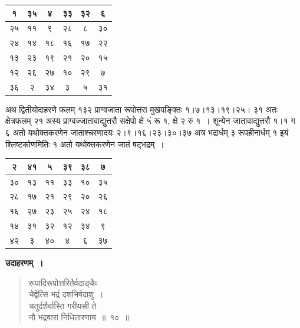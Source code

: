 \documentclass[11pt, openany]{book}
\begin{document}
\begin{table}[h]
	\centering
	\setlength{\extrarowheight}{2pt} \setlength{\tabcolsep}{2pt}
	\begin{tabular}{|c|c|c|c|c|c|}
		\hline
		१& ३५ & ४ & ३३ & ३२ & ६\\
		\hline
		२५ & ११ & ९ & २८ & ८ & ३० \\
		\hline
		२४ & १४ & १८ & १६ & १७ & २२\\
		\hline
		१३ & २३ & १९ & २१ & २० & १५\\
		\hline
		१२ & २६ & २७ & १० & २९ & ७ \\
		\hline
		३६ & २ & ३४ & ३ & ५ & ३१\\
		\hline
	\end{tabular}\qquad
\end{table}

अथ द्वितीयोदाहरणे फलम् १३२ प्राग्वजाता रूपोत्तरा मुखपङ्क्तिः १।७।१३।१९।२५। ३१ अतः क्षेत्रफलम् २१ अस्य प्राग्वज्जातावाद्युत्तरौ सक्षेपो क्षे ५ं रू १, क्षे २ रु १~। शून्येन जातावाद्युत्तरौ १।१ ग ६ अतो यथोक्तकरणेन जाताश्चरणादयः २।९।१६।२३।३०।३७ अत्र भद्रार्धम् ३ रूपहीनार्धम् १ इयं श्लिष्टकोणमितिः १ अतो यथोक्तकरणेन जातं षट्भद्रम्~।

\newpage

\begin{table}[h]
	\centering
	\setlength{\extrarowheight}{2pt} \setlength{\tabcolsep}{2pt}
	\begin{tabular}{|c|c|c|c|c|c|}
		\hline
		२ & ४१ & ५ & ३९ & ३८ & ७\\
		\hline
		३० & १३ & ११ & ३३ & १० & ३५ \\
		\hline
		२८ & १७ & २१ & २९ & २० & २६\\
		\hline
		१६ & २७ & २३ & २५ & २४ & १८\\
		\hline
		१४ & ३१ & ३२ & १२ & ३४ & ९ \\
		\hline
		४२ & ३ & ४० & ४ & ६ & ३७\\
		\hline
	\end{tabular}\qquad
\end{table}

\textbf{उदाहरणम्~।}

\begin{quote}
{\ex रूपादिरूपोत्तरितैर्वदाङ्कैः\\
चेद्वेत्सि भद्रं दशभिर्वदाशु~।\\
चतुर्दशैर्वास्ति गरीयसी ते\\
नौ भद्रवारां निधितारणाय~॥~१०~॥	}
\end{quote}
\end{document}
